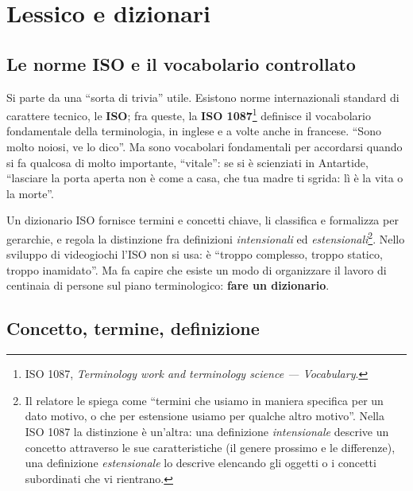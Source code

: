 \section{Lessico e dizionari}
\label{pt:sec:lessico}

\subsection{Le norme ISO e il vocabolario controllato}

Si parte da una ``sorta di trivia'' utile. Esistono norme internazionali
standard di carattere tecnico, le \textbf{ISO}; fra queste, la \textbf{ISO
1087}\footnote{ISO 1087, \emph{Terminology work and terminology science —
Vocabulary}.} definisce il vocabolario fondamentale della terminologia, in
inglese e a volte anche in francese. ``Sono molto noiosi, ve lo dico''. Ma
sono vocabolari fondamentali per accordarsi quando si fa qualcosa di molto
importante, ``vitale'': se si è scienziati in Antartide, ``lasciare la porta
aperta non è come a casa, che tua madre ti sgrida: lì è la vita o la morte''.

Un dizionario ISO fornisce termini e concetti chiave, li classifica e
formalizza per gerarchie, e regola la distinzione fra definizioni
\emph{intensionali} ed \emph{estensionali}\footnote{Il relatore le spiega come
``termini che usiamo in maniera specifica per un dato motivo, o che per
estensione usiamo per qualche altro motivo''. Nella ISO 1087 la distinzione è
un'altra: una definizione \emph{intensionale} descrive un concetto attraverso
le sue caratteristiche (il genere prossimo e le differenze), una definizione
\emph{estensionale} lo descrive elencando gli oggetti o i concetti subordinati
che vi rientrano.}. Nello sviluppo di videogiochi l'ISO non si usa: è ``troppo
complesso, troppo statico, troppo inamidato''. Ma fa capire che esiste un modo
di organizzare il lavoro di centinaia di persone sul piano terminologico:
\textbf{fare un dizionario}.

\subsection{Concetto, termine, definizione}


